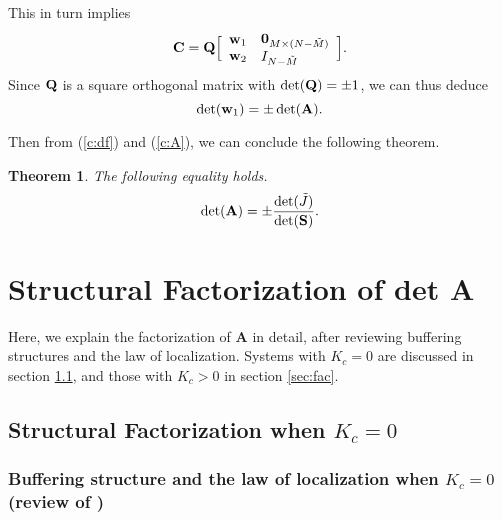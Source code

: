 \documentclass[ amsmath,amssymb,nofootinbib
]{revtex4-1}
\newtheorem{theorem}{Theorem}
\newcommand{\be}{\begin{equation}}
\newcommand{\ee}{\end{equation}}
\newcommand{\bQ}{{\bf Q}}
\newcommand{\bS}{{\bf S}}
\newcommand{\bw}{{\bf w}}
\newcommand{\tM}{{\tilde M}}
\newcommand{\tJ}{{\tilde J}}
\begin{document}
This in turn implies
\be
    {\bf C} = \bQ \Big[ \begin{array}{l}
                       \bw_1 \\
                        \bw_2\\
                    \end{array}  \begin{array}{l}
                       {\bf 0}_{M \times (N - \tM)} \\
                        I_{N - \tM}\\
                    \end{array}\Big].
\ee
Since  $\bQ$ is a square orthogonal matrix with $\det(\bQ) = \pm 1$,
we can thus deduce
\be  \label{c:A}
             \det({\bf w}_1)  = \pm \det({\bf A}).
\ee
%

Then from (\ref{c:df}) and (\ref{c:A}),
we can conclude the following theorem.
\begin{theorem} \label{t:main_20}
The following equality holds.
\be \label{e:e:main_20_temp10}
    \det({\bf A}) = \pm \frac{\det(\tJ)}{\det(\bS)}.
\ee
\end{theorem}




\section{ Structural Factorization of det {\bf A} }
Here, we explain the factorization of {\bf A} in detail, after reviewing buffering structures and the law of localization.
Systems with  $K_c =0$ are discussed in section \ref{sec:fac0}, and those with  $K_c >0$ in
section \ref{sec:fac}.


\subsection{ Structural Factorization when $K_c =0$}\label{sec:fac0}

\subsubsection{Buffering structure and the law of localization when $K_c =0$ (review of \cite{OM})}
\end{document}
